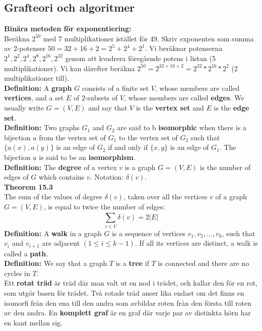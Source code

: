 \documentclass{article}
\begin{document}
\begin{multicols}{2}
\section{Grafteori och algoritmer}
\textbf{Binära metoden för exponentiering:}\\
Beräkna $2^{50}$ med 7 multiplikationer istället för 49. Skriv exponenten som summa av 2-potenser $50=32+16+2=2^5+2^4+2^1$. Vi beräknar potenserna $2^1,2^2,2^4,2^8,2^{16},2^{32}$ genom att kvadrera föregående potens i listan (5 multiplikationer). Vi kan därefter beräkna $2^{50}=2^{32+16+2}=2^{32}*2^{16}*2^2$ (2 multiplikationer till).\\
\newline
\textbf{Definition:} A \textbf{graph} $G$ consists of a finite set $V$, whose members are called \textbf{vertices}, and a set $E$ of 2-subsets of $V$, whose members are called \textbf{edges}. We usually write $G = (V,E)$ and say that $V$ is the \textbf{vertex set} and $E$ is the \textbf{edge set}.\\
\newline
\textbf{Definition:} Two graphs $G_1$ and $G_2$ are said to b \textbf{isomorphic} when there is a bijection $a$ from the vertex set of $G_1$ to the vertex set of $G_2$ such that $\{a(x),a(y)\}$ is an edge of $G_2$ if and only if $\{x,y\}$ is an edge of $G_1$. The bijection $a$ is said to be an \textbf{isomorphism}.\\
\newline
\textbf{Definition:} The \textbf{degree} of a vertex $v$ is a graph $G = (V,E)$ is the number of edges of $G$ which contains $v$. Notation: $\delta(v)$.\\ 
\newline
\textbf{Theorem 15.3}\\
The sum of the values of degree $\delta(v)$, taken over all the vertices $v$ of a graph $G = (V,E)$, is equal to twice the number of edges: 
$$\sum_{v \in V}^{} \delta(v) = 2|E|$$
\textbf{Definition:} A \textbf{walk} in a graph $G$ is a sequence of vertices $v_1, v_2,...,v_k$, such that $v_i$ and $v_{i+1}$ are adjacent $(1 \leq i \leq k-1)$. If all its vertices are distinct, a walk is called a \textbf{path}.\\
\newline
\textbf{Definition:} We say that a graph $T$ is a \textbf{tree} if $T$ is connected and there are no cycles in $T$.\\ 
\newline
Ett \textbf{rotat träd} är träd där man valt ut en nod i trädet, och kallar den för en rot, som utgör basen för trädet. Två rotade träd anser lika endast om det finns en isomorfi från den ena till den andra som avbildar roten från den första till roten av den andra. En \textbf{komplett graf} är en graf där varje par av distinkta hörn har en kant mellan sig. 


\end{multicols}
\end{document}
